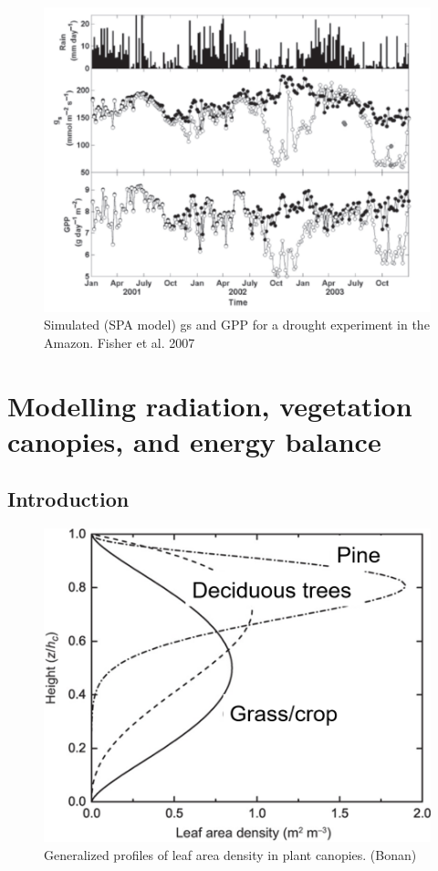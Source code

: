 \documentclass[
  oneside]{book}
\begin{document}
\begin{figure}

{\centering \includegraphics[width=0.8\linewidth]{figures/chap2/fisher2} 

}

\caption{Simulated (SPA model) gs and GPP for a drought experiment in the Amazon. Fisher et al. 2007}\label{fig:f225}
\end{figure}

\hypertarget{modelling-radiation-vegetation-canopies-and-energy-balance}{%
\chapter{Modelling radiation, vegetation canopies, and energy balance}\label{modelling-radiation-vegetation-canopies-and-energy-balance}}


\hypertarget{introduction}{%
\section{Introduction}\label{introduction}}

\begin{figure}

{\centering \includegraphics[width=0.8\linewidth]{figures/chap3/f31_LAD} 

}

\caption{Generalized profiles of leaf area density in plant canopies. (Bonan)}\label{fig:f31}
\end{figure}
\end{document}
